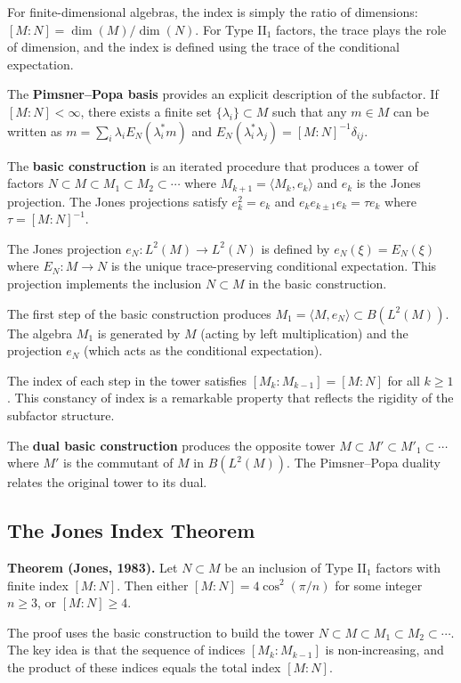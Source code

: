 For finite-dimensional algebras, the index is simply the ratio of dimensions: $[M:N] = \dim(M)/\dim(N)$. For Type II$_1$ factors, the trace plays the role of dimension, and the index is defined using the trace of the conditional expectation.

The \textbf{Pimsner--Popa basis} provides an explicit description of the subfactor. If $[M:N] < \infty$, there exists a finite set $\{\lambda_i\} \subset M$ such that any $m \in M$ can be written as $m = \sum_i \lambda_i E_N(\lambda_i^* m)$ and $E_N(\lambda_i^* \lambda_j) = [M:N]^{-1} \delta_{ij}$.

The \textbf{basic construction} is an iterated procedure that produces a tower of factors $N \subset M \subset M_1 \subset M_2 \subset \cdots$ where $M_{k+1} = \langle M_k, e_k \rangle$ and $e_k$ is the Jones projection. The Jones projections satisfy $e_k^2 = e_k$ and $e_k e_{k\pm 1} e_k = \tau e_k$ where $\tau = [M:N]^{-1}$.

The Jones projection $e_N: L^2(M) \to L^2(N)$ is defined by $e_N(\xi) = E_N(\xi)$ where $E_N: M \to N$ is the unique trace-preserving conditional expectation. This projection implements the inclusion $N \subset M$ in the basic construction.

The first step of the basic construction produces $M_1 = \langle M, e_N \rangle \subset B(L^2(M))$. The algebra $M_1$ is generated by $M$ (acting by left multiplication) and the projection $e_N$ (which acts as the conditional expectation).

The index of each step in the tower satisfies $[M_k : M_{k-1}] = [M:N]$ for all $k \geq 1$. This constancy of index is a remarkable property that reflects the rigidity of the subfactor structure.

The \textbf{dual basic construction} produces the opposite tower $M \subset M' \subset M'_1 \subset \cdots$ where $M'$ is the commutant of $M$ in $B(L^2(M))$. The Pimsner--Popa duality relates the original tower to its dual.

\subsection*{The Jones Index Theorem}

\textbf{Theorem (Jones, 1983).} Let $N \subset M$ be an inclusion of Type II$_1$ factors with finite index $[M:N]$. Then either $[M:N] = 4\cos^2(\pi/n)$ for some integer $n \geq 3$, or $[M:N] \geq 4$.

The proof uses the basic construction to build the tower $N \subset M \subset M_1 \subset M_2 \subset \cdots$. The key idea is that the sequence of indices $[M_k : M_{k-1}]$ is non-increasing, and the product of these indices equals the total index $[M:N]$.

